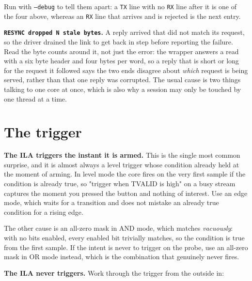 \documentclass[../manual.tex]{subfiles}
\begin{document}
Run with \texttt{--debug} to tell them apart: a \texttt{TX} line with no \texttt{RX} line after it is one of the four above, whereas an \texttt{RX} line that arrives and is rejected is the next entry.

\textbf{\texttt{RESYNC dropped N stale bytes}.} A reply arrived that did not match its request, so the driver drained the link to get back in step before reporting the failure. Read the byte counts around it, not just the error: the wrapper answers a read with a six byte header and four bytes per word, so a reply that is short or long for the request it followed says the two ends disagree about \emph{which} request is being served, rather than that one reply was corrupted. The usual cause is two things talking to one core at once, which is also why a session may only be touched by one thread at a time.

\section{The trigger}
\label{sec:tr_trigger}

\textbf{The ILA triggers the instant it is armed.} This is the single most common surprise, and it is almost always a level trigger whose condition already held at the moment of arming. In level mode the core fires on the very first sample if the condition is already true, so "trigger when TVALID is high" on a busy stream captures the moment you pressed the button and nothing of interest. Use an edge mode, which waits for a transition and does not mistake an already true condition for a rising edge.

The other cause is an all-zero mask in AND mode, which matches \emph{vacuously}: with no bits enabled, every enabled bit trivially matches, so the condition is true from the first sample. If the intent is never to trigger on the probe, use an all-zero mask in OR mode instead, which is the combination that genuinely never fires.

\textbf{The ILA never triggers.} Work through the trigger from the outside in:
\end{document}
